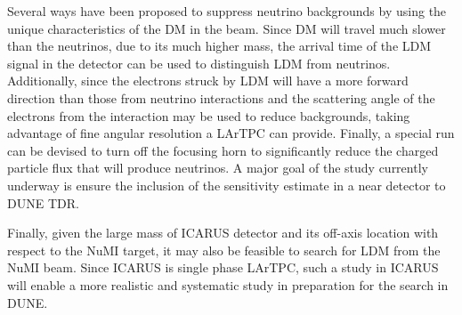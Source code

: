 Several ways have been proposed to suppress neutrino backgrounds by using the unique characteristics of the DM in the beam. Since DM will travel much slower than the neutrinos, due to its much higher mass, the arrival time of the LDM signal in the detector can be used to distinguish LDM from neutrinos.  Additionally, since the electrons struck by LDM will have a more forward direction than those from neutrino interactions and the scattering angle of the electrons from the interaction may be used to reduce backgrounds, taking advantage of fine angular resolution a LArTPC can provide. Finally, a special run can be devised to turn off the focusing horn to significantly reduce the charged particle flux that will produce neutrinos. A major goal of the study currently underway is ensure the inclusion of the sensitivity estimate in a near detector to DUNE TDR.

Finally, given the large mass of ICARUS detector and its off-axis location with respect to the NuMI target, it may also be feasible to search for LDM from the NuMI beam.  Since ICARUS is single phase LArTPC, such a study in ICARUS will enable a more realistic and systematic study in preparation for the search in DUNE. 

